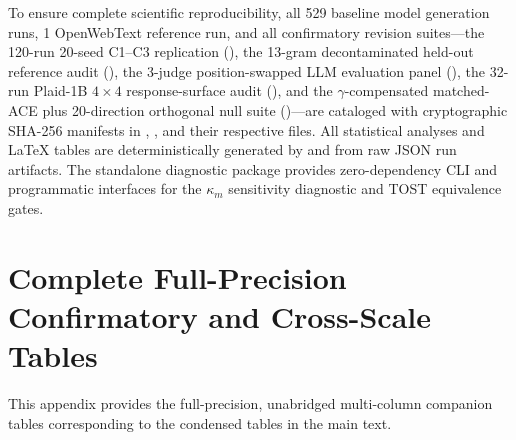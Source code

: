 \documentclass[11pt,a4paper]{article}
\begin{document}
To ensure complete scientific reproducibility, all 529 baseline model generation runs, 1 OpenWebText reference run, and all confirmatory revision suites---the 120-run 20-seed C1--C3 replication (), the 13-gram decontaminated held-out reference audit (), the 3-judge position-swapped LLM evaluation panel (), the 32-run Plaid-1B $4\times 4$ response-surface audit (), and the $\gamma$-compensated matched-ACE plus 20-direction orthogonal null suite ()---are cataloged with cryptographic SHA-256 manifests in , , and their respective  files.
All statistical analyses and LaTeX tables are deterministically generated by  and  from raw JSON run artifacts. The standalone diagnostic package  provides zero-dependency CLI and programmatic interfaces for the $\kappa_m$ sensitivity diagnostic and TOST equivalence gates.

\section{Complete Full-Precision Confirmatory and Cross-Scale Tables}
\label{app:full_tables}

This appendix provides the full-precision, unabridged multi-column companion tables corresponding to the condensed tables in the main text.

\begin{table}[p]
    \centering
    \caption{Full confirmatory operating-point equivalence (Panel A: all 13 columns including paired CRN 95\% CIs, unpaired Welch sensitivity intervals, Leave-One-Seed-Out ranges, and Hedges' $g$) and secondary distributional divergence (Panel B) across pairs \textbf{C1}--\textbf{C3} on ELF-B ($K=32, M=1{,}000$/seed) and exploratory pairs on ELF-M.}
    \label{tab:confirmatory_tost_full}
    
\end{table}

\begin{table}[p]
    \centering
    \caption{Full ELF-M (342.5M, $K=64$) factorial results across 11 cells (29 runs, $M=1{,}000$/seed) and complete seed-blocked ANOVA contrasts ($df=4$).}
    \label{tab:elfm_m1_full}
    
\end{table}
\end{document}
